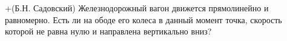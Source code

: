 +(Б.Н. Садовский)
Железнодорожный вагон движется прямолинейно и равномерно. Есть ли
на ободе его колеса в данный момент точка, скорость которой не равна
нулю и направлена вертикально вниз?
